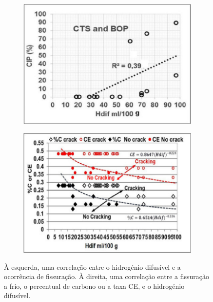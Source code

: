 \begin{figure}[htb]
    \centering
    \begin{subfigure}{.5\textwidth}
      \centering
      \includegraphics[width = 0.9\linewidth]{Figures/Cap2/Hdif_CE.png}
      \caption{}
      \label{fig:Hdif_CE}
    \end{subfigure}%
    \begin{subfigure}{.5\textwidth}
      \centering
      \includegraphics[width = 0.9\linewidth]{Figures/Cap2/CE_Hdif_Crack.png}
      \caption{}
      \label{fig:CE_Hdif_Crack}
    \end{subfigure}
    \caption[Correlações entre hidrogénio difusível e fissuração induzida por hidrogénio]%
    {À esquerda, uma correlação entre o hidrogénio difusível e a ocorrência de fissuração. À direita, uma correlação entre a fissuração a frio, o percentual de carbono ou a taxa CE, e o hidrogénio difusível.}
    \end{figure}
